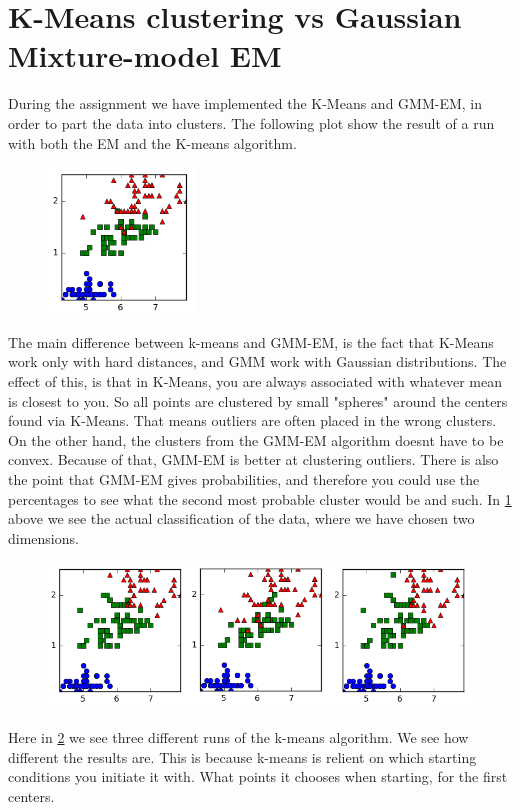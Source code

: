 \documentclass[a4paper,10pt,article,oneside,english]{memoir}
\let\oldcaption\caption
\renewcommand{\caption}[1]{\oldcaption{\emph{#1}}}
\begin{document}
\section*{K-Means clustering vs Gaussian Mixture-model EM}
During the assignment we have implemented the K-Means and GMM-EM, in order to part the data into clusters. The following plot show the result of a run with both the EM and the K-means algorithm.
\begin{figure}
	\centering
	\includegraphics[width=0.35\textwidth]{original.png}
	\caption{}
	\label{fig:orig}
\end{figure}
The main difference between k-means and GMM-EM, is the fact that K-Means work only with hard distances, and GMM work with Gaussian distributions. The effect of this, is that in K-Means, you are always associated with whatever mean is closest to you. So all points are clustered by small "spheres" around the centers found via K-Means. That means outliers are often placed in the wrong clusters. On the other hand, the clusters from the GMM-EM algorithm doesnt have to be convex. Because of that, GMM-EM is better at clustering outliers.
There is also the point that GMM-EM gives probabilities, and therefore you could use the percentages to see what the second most probable cluster would be and such.
In \ref{fig:orig} above we see the actual classification of the data, where we have chosen two dimensions.
\begin{figure}
	\centering
	\includegraphics[width=\textwidth]{kmeans1.png}
	\caption{}
	\label{fig:km}
\end{figure}
Here in \ref{fig:km} we see three different runs of the k-means algorithm. We see how different the results are. This is because k-means is relient on which starting conditions you initiate it with. What points it chooses when starting, for the first centers.
\end{document}
